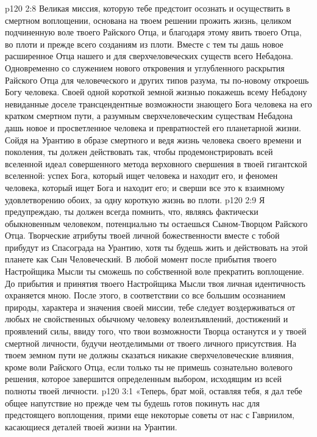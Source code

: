 \vs p120 2:8 \pc {}\bibnobreakspace Великая миссия, которую тебе предстоит осознать и осуществить в смертном воплощении, основана на твоем решении прожить жизнь, целиком подчиненную воле твоего Райского Отца, и благодаря этому явить  твоего Отца, во плоти и прежде всего созданиям из плоти. Вместе с тем ты дашь новое расширенное  Отца нашего и для сверхчеловеческих существ всего Небадона. Одновременно со служением нового откровения и углубленного раскрытия Райского Отца для человеческого и других типов разума, ты по\hyp{}новому откроешь Богу человека. Своей одной короткой земной жизнью покажешь всему Небадону невиданные доселе трансцендентные возможности знающего Бога человека на его кратком смертном пути, а разумным сверхчеловеческим существам Небадона дашь новое и просветленное  человека и превратностей его планетарной жизни. Сойдя на Урантию в образе смертного и ведя жизнь человека своего времени и поколения, ты должен действовать так, чтобы продемонстрировать всей вселенной идеал совершенного метода верховного свершения в твоей гигантской вселенной: успех Бога, который ищет человека и находит его, и феномен человека, который ищет Бога и находит его; и сверши все это к взаимному удовлетворению обоих, за одну короткую жизнь во плоти.
\vs p120 2:9 \pc {}\bibnobreakspace Я предупреждаю, ты должен всегда помнить, что, являясь фактически обыкновенным человеком, потенциально ты остаешься Сыном\hyp{}Творцом Райского Отца. Творческие атрибуты твоей личной божественности вместе с тобой прибудут из Спасограда на Урантию, хотя ты будешь жить и действовать на этой планете как Сын Человеческий. В любой момент после прибытия твоего Настройщика Мысли ты сможешь по собственной воле прекратить воплощение. До прибытия и принятия твоего Настройщика Мысли твоя личная идентичность охраняется мною. После этого, в соответствии со все большим осознанием природы, характера и значения своей миссии, тебе следует воздерживаться от любых не свойственных обычному человеку волеизъявлений, достижений и проявлений силы, ввиду того, что твои возможности Творца останутся и у твоей смертной личности, будучи неотделимыми от твоего личного присутствия. На твоем земном пути не должны сказаться никакие сверхчеловеческие влияния, кроме воли Райского Отца, если только ты не примешь сознательно волевого решения, которое завершится определенным выбором, исходящим из всей полноты твоей личности.
\vs p120 3:1 «Теперь, брат мой, оставляя тебя, я дал тебе общее напутствие но прежде чем ты будешь готов покинуть нас для предстоящего воплощения, прими еще некоторые советы от нас с Гавриилом, касающиеся деталей твоей жизни на Урантии.
